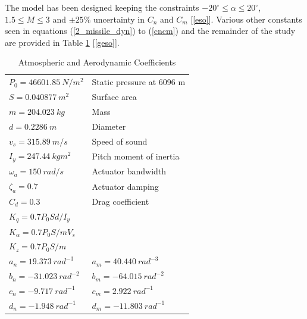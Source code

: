 \documentclass[conference]{IEEEtran}
\begin{document}
	The model has been designed keeping the constraints $-20^\circ\le \alpha \le20^\circ$, $1.5 \le M \le 3$ and $\pm25\%$ uncertainty in $C_n$ and $C_m$ [{\ref{eso}}]. Various other constants seen in equations (\ref{2_missile_dyn}) to (\ref{cncm}) and the remainder of the study are provided in Table \ref{constants_table} [\ref{geso}].
	\begin{table}[htbp]
		\centering
		\caption{Atmospheric and Aerodynamic Coefficients}
		\label{constants_table}	
		\begin{tabular}{ll}		
			\hline
			$P_0 = 46601.85 ~ N/m^2$ 		& \textmd{Static pressure at 6096 m} \\
			$S = 0.040877 ~ m^2$ 			& \textmd{Surface area} \\
			$m = 204.023 ~ kg$				& \textmd{Mass} \\
			$d = 0.2286 ~ m$				& \textmd{Diameter} \\
			$v_s = 315.89 ~ m/s$ 			& \textmd{Speed of sound} \\
			$I_y = 247.44 ~ kgm^2$			& \textmd{Pitch moment of inertia} \\
			$\omega_a = 150 ~ rad/s$ 		& \textmd{Actuator bandwidth} \\
			$\zeta_a = 0.7$					& \textmd{Actuator damping} \\
			$C_d = 0.3$						& \textmd{Drag coefficient} \\						
			$K_q = 0.7P_0Sd/I_y$			& \textmd{} \\	
			$K_\alpha = 0.7P_0S/mV_s$		& \textmd{} \\
			$K_z = 0.7P_0S/m$				& \textmd{} \\
			$a_n = 19.373 ~ rad^{-3}$		& $a_m = 40.440 ~ rad^{-3}$ \\
			$b_n = -31.023 ~ rad^{-2}$		& $b_m = -64.015 ~ rad^{-2}$ \\
			$c_n = -9.717 ~ rad^{-1}$		& $c_m = 2.922 ~ rad^{-1}$ \\
			$d_n = -1.948 ~ rad^{-1}$		& $d_m = -11.803 ~ rad^{-1}$ \\
			\hline
		\end{tabular}
	\end{table}

\end{document}
